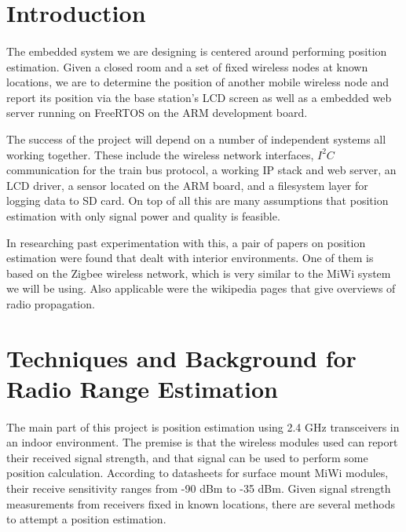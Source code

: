\documentclass{article}
\begin{document}
\section*{Introduction}
\paragraph*{}
The embedded system we are designing is centered around performing position 
estimation.  Given a closed room and a set of fixed wireless nodes at known
locations, we are to determine the position of another mobile wireless node and
report its position via the base station's LCD screen as well as a embedded web
server running on FreeRTOS on the ARM development board.

The success of the project will depend on a number of independent systems all
working together.  These include the wireless network interfaces, $I^2C$
communication for the train bus protocol, a working IP stack and web server, an
LCD driver, a sensor located on the ARM board, 
and a filesystem layer for logging data to SD card.  On top of all
this are many assumptions that position estimation with only signal power
and quality is feasible.

In researching past experimentation with this, a pair of papers on position
estimation were found that dealt with interior environments.  One of them
is based on the Zigbee wireless network, which is very similar to the MiWi 
system we will be using.  Also applicable were the wikipedia pages that give
overviews of radio propagation.


\section*{Techniques and Background for Radio Range Estimation}
\paragraph*{}
The main part of this project is position estimation using 2.4 GHz transceivers in an indoor environment.  The premise is that the wireless modules used can report their received signal strength, and that signal can be used to perform some position calculation.  According to datasheets for surface mount MiWi modules, their receive sensitivity ranges from -90 dBm to -35 dBm.  Given signal strength measurements from receivers fixed in known locations, there are several methods to attempt a position estimation.
\end{document}
